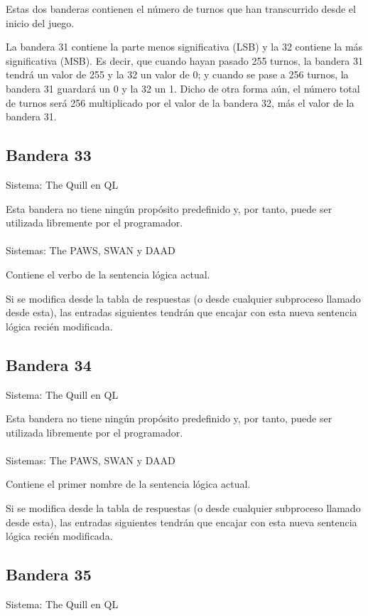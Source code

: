 \documentclass[11pt, a5paper]{article}
\newcommand{\quill}{\textsf{The Quill}\xspace}
\newcommand{\paw}{\textsf{The PAWS}\xspace}
\newcommand{\swan}{\textsf{SWAN}\xspace}
\newcommand{\daad}{\textsf{DAAD}\xspace}
\newcommand{\sistema}[1]{\noindent Sistema: #1 \nopagebreak}
\newcommand{\sistemas}[1]{\noindent Sistemas: #1 \nopagebreak}
\begin{document}
Estas dos banderas contienen el número de turnos que han transcurrido desde el inicio del juego.

La bandera 31 contiene la parte menos significativa (LSB) y la 32 contiene la más significativa (MSB). Es decir, que cuando hayan pasado 255 turnos, la bandera 31 tendrá un valor de 255 y la 32 un valor de 0; y cuando se pase a 256 turnos, la bandera 31 guardará un 0 y la 32 un 1. Dicho de otra forma aún, el número total de turnos será 256 multiplicado por el valor de la bandera 32, más el valor de la bandera 31.

\subsection{Bandera 33}

\sistema{\quill en QL}

Esta bandera no tiene ningún propósito predefinido y, por tanto, puede ser utilizada libremente por el programador.
\\\ \\
\sistemas{\paw, \swan y \daad}

Contiene el verbo de la sentencia lógica actual.

Si se modifica desde la tabla de respuestas (o desde cualquier subproceso llamado desde esta), las entradas siguientes tendrán que encajar con esta nueva sentencia lógica recién modificada.

\subsection{Bandera 34}

\sistema{\quill en QL}

Esta bandera no tiene ningún propósito predefinido y, por tanto, puede ser utilizada libremente por el programador.
\\\ \\
\sistemas{\paw, \swan y \daad}

Contiene el primer nombre de la sentencia lógica actual.

Si se modifica desde la tabla de respuestas (o desde cualquier subproceso llamado desde esta), las entradas siguientes tendrán que encajar con esta nueva sentencia lógica recién modificada.

\subsection{Bandera 35}

\sistema{\quill en QL}
\end{document}
